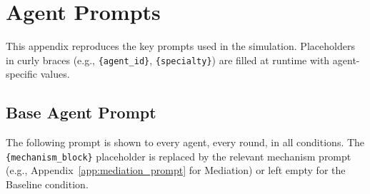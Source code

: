 \documentclass{article}
\begin{document}
\section{Agent Prompts}
\label{app:prompts}

This appendix reproduces the key prompts used in the simulation. Placeholders in curly braces (e.g., \texttt{\{agent\_id\}}, \texttt{\{specialty\}}) are filled at runtime with agent-specific values.

\subsection{Base Agent Prompt}
\label{app:base_prompt}

The following prompt is shown to every agent, every round, in all conditions. The \texttt{\{mechanism\_block\}} placeholder is replaced by the relevant mechanism prompt (e.g., Appendix~\ref{app:mediation_prompt} for Mediation) or left empty for the Baseline condition.
\end{document}
